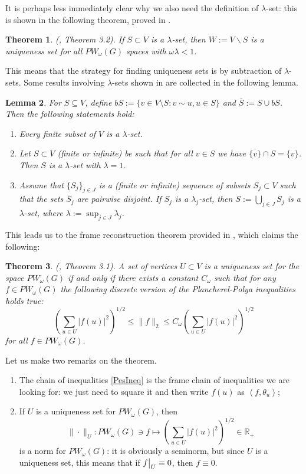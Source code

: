 \documentclass[12pt]{amsart}
\newtheorem{theorem}{Theorem}[section]
\newtheorem{lemma}[theorem]{Lemma}
\theoremstyle{definition}
\numberwithin{equation}{section}
\newcommand\restr[2]{{%
  \left.\kern-\nulldelimiterspace %
  #1 %
  \vphantom{\big|} %
  \right|_{#2} %
  }}
\theoremstyle{definition}
\theoremstyle{remark}
\numberwithin{equation}{section}
\begin{document}
It is perhaps less immediately clear why we also need the definition of $\lambda$-set: this is shown in the following theorem, proved in \cite{PW1}.
\begin{theorem}
\label{teoremerda}
    \emph{(\cite{PW1}, Theorem 3.2)}. If $S\subset V$ is a $\lambda$-set, then $W:=V\backslash S$ is a uniqueness set for all $PW_\omega(G)$ spaces with $\omega\lambda<1$.
\end{theorem}
This means that the strategy for finding uniqueness sets is by subtraction of $\lambda$-sets. Some results involving $\lambda$-sets shown in \cite{PW1} are collected in the following lemma.
\begin{lemma}
\label{lemma}
    For $S \subseteq V$, define $bS := \{v \in V\setminus S: v\sim u, u \in S\}$ and $\overline{S} := S \cup bS$. Then the following statements hold:
    \begin{enumerate}
        \item Every finite subset of $V$ is a $\lambda$-set.
        \item Let $S\subset V$ (finite or infinite) be such that for all $v \in S$ we have $\overline{\{v\}}\cap S = \{v\}$. Then $S$ is a $\lambda$-set with $\lambda = 1$.
        \item   Assume that $\{S_j\}_{j\in J}$ is a (finite or infinite) sequence of subsets $S_j \subset V$ such that the sets $\overline{S}_j$ are pairwise disjoint. If $S_j$ is a $\lambda_j$-set, then $S:=\bigcup_{j \in J}S_j$ is a $\lambda$-set, where $\lambda := \sup_{j\in J}\lambda_j$.
    \end{enumerate}
\end{lemma}
This leads us to the frame reconstruction theorem provided in \cite{PW1}, which claims the following:
\begin{theorem}
\label{teoPes}
    \emph{(\cite{PW1}, Theorem 3.1)}. A set of vertices $U \subset V$ is a uniqueness set for the space $P W_\omega(G)$ if and only if there exists a constant $C_\omega$ such that for any $f \in P W_\omega(G)$ the following discrete version of the Plancherel-Polya inequalities holds true:
\begin{equation}
\label{PesIneq}
    \left(\sum_{u \in U}|f(u)|^2\right)^{1 / 2} \leq\|f\|_{2} \leq C_\omega\left(\sum_{u \in U}|f(u)|^2\right)^{1 / 2}
\end{equation}
for all $f \in P W_\omega(G)$.
\end{theorem}
Let us make two remarks on the theorem.
\begin{enumerate}
    \item The chain of inequalities \eqref{PesIneq} is the frame chain of inequalities we are looking for: we just need to square it and then write $f(u)$ as $\left<f, \theta_u\right>$;
    \item If $U$ is a uniqueness set for $PW_\omega(G)$, then $$\|\cdot\|_U : PW_\omega(G) \ni f  \mapsto\left(\sum_{u \in U}|f(u)|^2\right)^{1/2} \in \mathbb{R}_+$$ is a norm for $PW_\omega(G)$: it is obviously a seminorm, but since $U$ is a uniqueness set, this means that if $\restr{f}{U}\equiv 0$, then $f \equiv 0$.
\end{enumerate}
\end{document}
